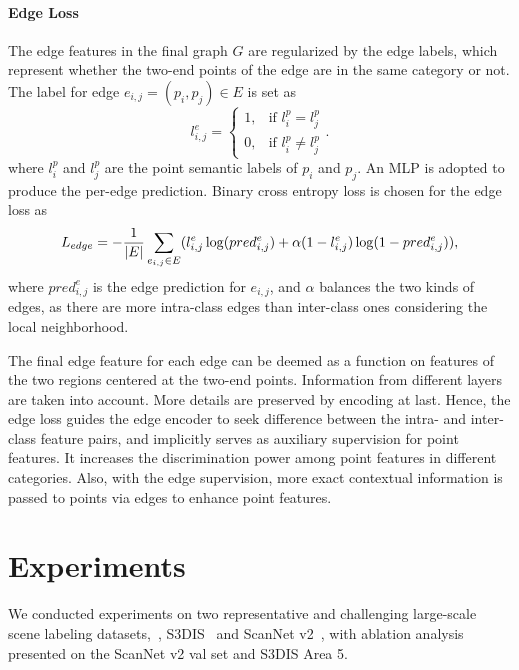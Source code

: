 \documentclass[10pt,twocolumn,letterpaper]{article}
\begin{document}
\vspace{-0.12in}
\paragraph{Edge Loss} 
The edge features in the final graph $G$ are regularized by the edge labels, which represent whether the two-end points of the edge are in the same category or not. The label for edge $e_{i, j} = (p_i, p_j) \in E $ is set as
\begin{equation}
l_{i, j}^{e} = 
\left \{
\begin{array}{lr}
1, &\text{if }l_i^p = l_j^p \\
0, &\text{if } l_i^p \neq l_j^p
\end{array}.
\right.
\end{equation}
where $l_i^p$ and $l_j^p$ are the point semantic labels of $p_i$ and $p_j$.
An MLP is adopted to produce the per-edge prediction. Binary cross entropy loss is chosen for the edge loss as
\begin{equation}\footnotesize
L_{edge} = - \frac{1}{|E|}\sum_{e_{i, j} \in E} ( l_{i, j}^e \log(pred_{i, j}^e) + \alpha (1 - l_{i, j}^e) \log (1 - pred_{i, j}^e)),
\end{equation}
where $pred_{i,j}^e$ is the edge prediction for $e_{i,j}$, and $\alpha$ balances the two kinds of edges, as there are more intra-class edges than inter-class ones considering the local neighborhood. 

The final edge feature for each edge can be deemed as a function on features of the two regions centered at the two-end points. Information from different layers are taken into account.
More details are preserved by encoding at last. Hence, the edge loss guides the edge encoder to seek difference between the intra- and inter-class feature pairs, and implicitly serves as auxiliary supervision for point features. It increases the discrimination power among point features in different categories. Also, with the edge supervision, more exact contextual information is passed to points via edges to enhance point features.

\section{Experiments}
We conducted experiments on two representative and challenging large-scale scene labeling datasets,~\ie, S3DIS~\cite{s3dis} and ScanNet v2~\cite{scannet}, with ablation analysis presented on the ScanNet v2 val set and S3DIS Area 5.
\end{document}

